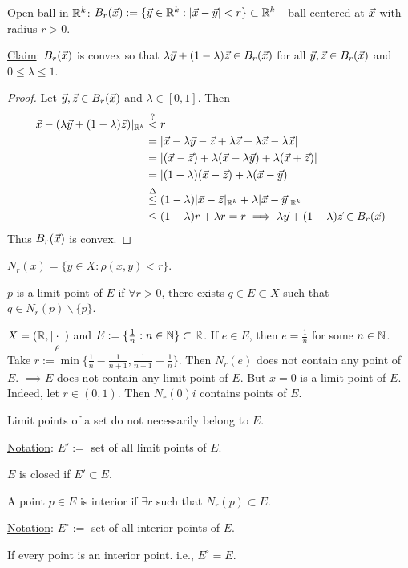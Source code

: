 \documentclass[]{article}
\begin{document}
\begin{example}
	Open ball in $\mathbb{R}^k$: $B_r(\vec{x}) := \{ \vec{y}\in\mathbb{R}^k : |\vec{x}-\vec{y}|<r \}\subset \mathbb{R}^k$ - ball centered at $\vec{x}$ with radius $r>0$.
	
	\ul{Claim}: $B_r(\vec{x})$ is convex so that $\lambda\vec{y} + (1-\lambda)\vec{z}\in B_r(\vec{x})$ for all $\vec{y},\vec{z}\in B_r(\vec{x})$ and $0\leq \lambda\leq 1$.
	\begin{proof}
		Let $\vec{y},\vec{z}\in B_r(\vec{x})$ and $\lambda\in[0,1]$. Then
		\begin{align*}
			|\vec{x} -(\lambda\vec{y} + (1-\lambda)\vec{z})|_{\mathbb{R}^k} &\overset{?}{<} r \\
			&= | \vec{x} - \lambda\vec{y} - \vec{z} + \lambda\vec{z} +\lambda\vec{x} - \lambda\vec{x}| \\
		 	&= |(\vec{x} - \vec{z}) + \lambda(\vec{x} -\lambda\vec{y}) +\lambda(\vec{x} +\vec{z})| \\
			&= |(1-\lambda)(\vec{x}-\vec{z}) + \lambda(\vec{x}-\vec{y})| \\
			&\overset{\Delta}{\leq} (1-\lambda)|\vec{x}-\vec{z}|_{\mathbb{R}^k} + \lambda|\vec{x}-\vec{y}|_{\mathbb{R}^k} \\
			&\leq (1-\lambda)r + \lambda r = r \implies \lambda\vec{y} + (1-\lambda)\vec{z}\in B_r(\vec{x})
		\end{align*}
		Thus $B_r(\vec{x})$ is convex.
	\end{proof}
\end{example}

\begin{definition}
	[Neighborhood] $N_r(x) = \{y\in X: \rho(x,y)<r\}$.
\end{definition}
\begin{definition}
	 $p$ is a limit point of $E$ if $\forall r>0$, there exists $q\in E\subset X$ such that $q\in N_r(p)\backslash\{p\}$.
\end{definition}
\begin{example}
	$X = (\mathbb{R},\underset{\rho}{|\cdot|})$ and $E:= \{\frac{1}{n}:n\in\mathbb{N}\}\subset\mathbb{R}$.
	If $e\in E$, then $e = \frac{1}{n}$ for some $n\in\mathbb{N}$.
	Take $r:= \min\{\frac{1}{n}-\frac{1}{n+1},\frac{1}{n-1}-\frac{1}{n}\}$.
	Then $N_r(e)$ does not contain any point of $E$. $\implies E$ does not contain any limit point of $E$.
	But $x=0$ is a limit point of $E$. Indeed, let $r\in(0,1)$. Then $N_r(0)i$ contains points of $E$.
\end{example}
\begin{remark}
	Limit points of a set do not necessarily belong to $E$.
\end{remark}
\ul{Notation}: $E':=$ set of all limit points of $E$.
\begin{definition}
	 $E$ is closed if $E'\subset E$.
\end{definition}
\begin{definition}
	 A point $p\in E$ is interior if $\exists r$ such that $N_r(p)\subset E$.
\end{definition}
\ul{Notation}: $E^\circ := $ set of all interior points of $E$.
\begin{definition}
	 If every point is an interior point. i.e., $E^\circ = E$.
\end{definition}
\end{document}
